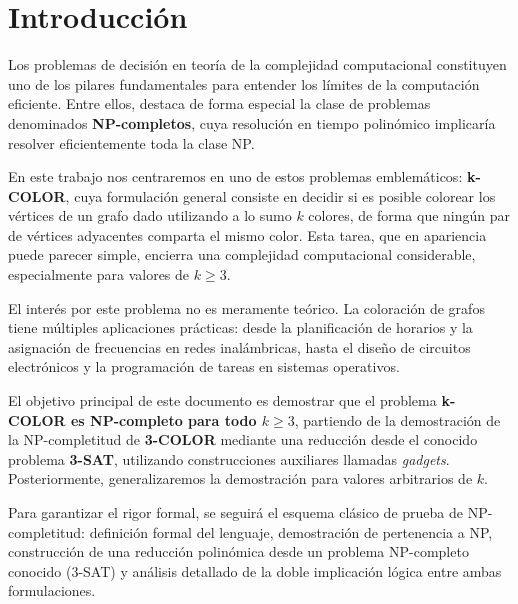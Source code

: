 \documentclass[a4paper,12pt]{article}
\begin{document}
\newpage





\section{Introducción}

Los problemas de decisión en teoría de la complejidad computacional constituyen uno de los pilares fundamentales para entender los límites de la computación eficiente. Entre ellos, destaca de forma especial la clase de problemas denominados \textbf{NP-completos}, cuya resolución en tiempo polinómico implicaría resolver eficientemente toda la clase NP.

En este trabajo nos centraremos en uno de estos problemas emblemáticos: \textbf{k-COLOR}, cuya formulación general consiste en decidir si es posible colorear los vértices de un grafo dado utilizando a lo sumo $k$ colores, de forma que ningún par de vértices adyacentes comparta el mismo color. Esta tarea, que en apariencia puede parecer simple, encierra una complejidad computacional considerable, especialmente para valores de $k \geq 3$.

El interés por este problema no es meramente teórico. La coloración de grafos tiene múltiples aplicaciones prácticas: desde la planificación de horarios y la asignación de frecuencias en redes inalámbricas, hasta el diseño de circuitos electrónicos y la programación de tareas en sistemas operativos.

El objetivo principal de este documento es demostrar que el problema \textbf{k-COLOR es NP-completo para todo $k \geq 3$}, partiendo de la demostración de la NP-completitud de \textbf{3-COLOR} mediante una reducción desde el conocido problema \textbf{3-SAT}, utilizando construcciones auxiliares llamadas \emph{gadgets}. Posteriormente, generalizaremos la demostración para valores arbitrarios de $k$.

Para garantizar el rigor formal, se seguirá el esquema clásico de prueba de NP-completitud: definición formal del lenguaje, demostración de pertenencia a NP, construcción de una reducción polinómica desde un problema NP-completo conocido (3-SAT) y análisis detallado de la doble implicación lógica entre ambas formulaciones.
\end{document}
